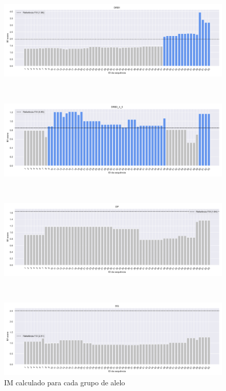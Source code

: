 \begin{figure}[htbp]
    \centering
    \begin{minipage}{0.9\textwidth}
        \centering
        \includegraphics[width=\textwidth]{figuras/plot_imuno_IMscore_DRB1.png}
    \end{minipage} \\[1ex]%
    \begin{minipage}{0.9\textwidth}
        \centering
        \includegraphics[width=\textwidth]{figuras/plot_imuno_IMscore_DRB3_4_5.png}
    \end{minipage} \\[1ex] %
    \begin{minipage}{0.9\textwidth}
        \centering
        \includegraphics[width=\textwidth]{figuras/plot_imuno_IMscore_DP.png}
    \end{minipage} \\[1ex]%
    \begin{minipage}{0.9\textwidth}
        \centering
        \includegraphics[width=\textwidth]{figuras/plot_imuno_IMscore_DQ.png}
    \end{minipage} 
    \caption{IM calculado para cada grupo de alelo}
\end{figure}


